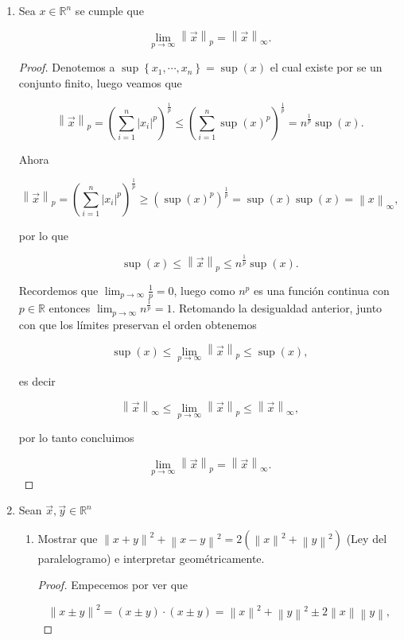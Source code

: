 \documentclass[letterpaper]{article}
\theoremstyle{definition}
\theoremstyle{lemathm}
\theoremstyle{lemathm}
\theoremstyle{lemathm}
\theoremstyle{lemademthm}
\newcommand{\limtoinf}[1]{\lim_{#1\to\infty}}
\newcommand{\pars}[1]{\left( #1 \right) }
\newcommand{\norm}[1]{\left\lVert#1\right\rVert}
\newcommand{\set}[1]{\left \{ #1 \right\} }
\newcommand{\RR}{\mathbb{R}}
\newcommand{\1}{\mathbbm{1}}
\begin{document}
\begin{enumerate}
\begin{enumerate}
		\end{enumerate}

		\item Sea $x\in\RR^n$ se cumple que
		
		\[\limtoinf{p} \norm{\vec{x}}_p = \norm{\vec{x}}_{\infty}.\]

		\begin{proof}
			Denotemos a $\sup\set{x_1,\cdots,x_n} = \sup\pars{x}$ el cual existe por se un conjunto finito, luego veamos que

			\[\norm{\vec{x}}_p = \pars{\sum_{i=1}^n |x_i|^{p}}^{\frac{1}{p}} \leq \pars{\sum_{i=1}^n \sup\pars{x}^{p}}^{\frac{1}{p}} = n^{\frac{1}{p}}\sup\pars{x}.\]

			Ahora

			\[\norm{\vec{x}}_p = \pars{\sum_{i=1}^n |x_i|^{p}}^{\frac{1}{p}} \geq \pars{\sup\pars{x}^{p}}^{\frac{1}{p}} = \sup\pars{x} \sup\pars{x} = \norm{x}_{\infty},\]

			por lo que

			\[\sup\pars{x} \leq \norm{\vec{x}}_p \leq n^{\frac{1}{p}}\sup\pars{x}.\]

			Recordemos que $\limtoinf{p} \frac{1}{p} = 0$, luego como $n^p$ es una función continua con $p\in\RR$ entonces $\limtoinf{p}n^{\frac{1}{p}} = 1$. Retomando la desigualdad anterior, junto con que los límites preservan el orden obtenemos

			\[\sup\pars{x} \leq \limtoinf{p} \norm{\vec{x}}_p \leq \sup\pars{x},\]

			es decir

			\[\norm{\vec{x}}_{\infty} \leq \limtoinf{p} \norm{\vec{x}}_p \leq \norm{\vec{x}}_{\infty},\]

			por lo tanto concluimos

			\[\limtoinf{p}\norm{\vec{x}}_p = \norm{\vec{x}}_{\infty}.\]
		\end{proof}

		\item Sean $\vec{x},\vec{y}\in\RR^n$
		
		\begin{enumerate}
			\item Mostrar que $\norm{x+y}^2 + \norm{x-y}^2 = 2\pars{\norm{x}^2+\norm{y}^2}$ (Ley del paralelogramo) e interpretar geométricamente.
			
			\begin{proof}
				Empecemos por ver que

				\[\norm{x\pm y}^2 = \pars{x\pm y}\cdot\pars{x\pm y} = \norm{x}^2 + \norm{y}^2 \pm 2\norm{x}\norm{y},\]


\end{proof}
\end{enumerate}
\end{enumerate}
\end{document}
